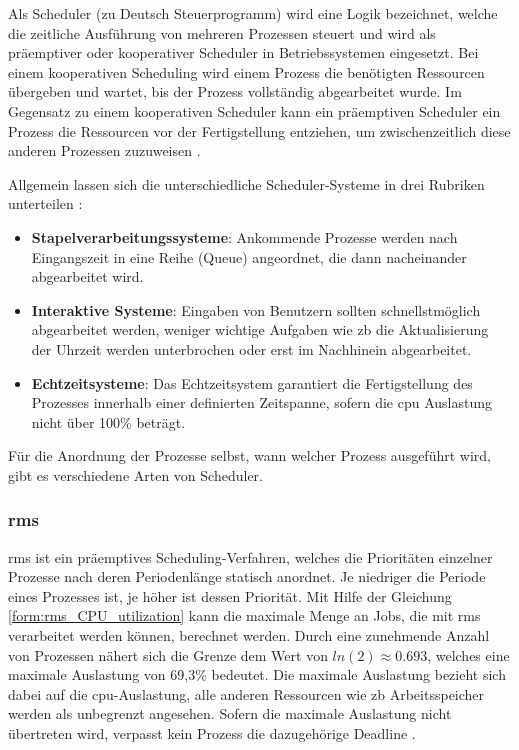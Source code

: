 \documentclass[../EDF Master Thesis.tex]{subfiles}
\begin{document}
Als Scheduler (zu Deutsch Steuerprogramm) wird eine Logik bezeichnet, welche die zeitliche Ausführung von mehreren Prozessen steuert und wird als präemptiver oder kooperativer Scheduler in Betriebssystemen eingesetzt.
Bei einem kooperativen Scheduling wird einem Prozess die benötigten Ressourcen übergeben und wartet, bis der Prozess vollständig abgearbeitet wurde.
Im Gegensatz zu einem kooperativen Scheduler kann ein präemptiven Scheduler ein Prozess die Ressourcen vor der Fertigstellung entziehen, um zwischenzeitlich diese anderen Prozessen zuzuweisen \parencite{wiki:003}.

Allgemein lassen sich die unterschiedliche Scheduler-Systeme in drei Rubriken unterteilen \parencite{wiki:007}:
\begin{itemize}
    \item \textbf{Stapelverarbeitungssysteme}: Ankommende Prozesse werden nach Eingangszeit in eine Reihe (Queue) angeordnet, die dann nacheinander abgearbeitet wird.
    \item \textbf{Interaktive Systeme}: Eingaben von Benutzern sollten schnellstmöglich abgearbeitet werden, weniger wichtige Aufgaben wie \ac{zb} die Aktualisierung der Uhrzeit werden unterbrochen oder erst im Nachhinein abgearbeitet.
    \item \textbf{Echtzeitsysteme}: Das Echtzeitsystem garantiert die Fertigstellung des Prozesses innerhalb einer definierten Zeitspanne, sofern die \ac{cpu} Auslastung nicht über 100\% beträgt.
\end{itemize}
Für die Anordnung der Prozesse selbst, wann welcher Prozess ausgeführt wird, gibt es verschiedene Arten von Scheduler.


\subsubsection{\ac{rms}} \label{section:rms}
    \ac{rms} ist ein präemptives Scheduling-Verfahren, welches die Prioritäten einzelner Prozesse nach deren Periodenlänge statisch anordnet.
    Je niedriger die Periode eines Prozesses ist, je höher ist dessen Priorität.
    Mit Hilfe der Gleichung \ref{form:rms_CPU_utilization} kann die maximale Menge an Jobs, die mit \ac{rms} verarbeitet werden können, berechnet werden.
    Durch eine zunehmende Anzahl von Prozessen nähert sich die Grenze dem Wert von $ln(2) \approx 0.693$, welches eine maximale Auslastung von 69,3\% bedeutet.
    Die maximale Auslastung bezieht sich dabei auf die \ac{cpu}-Auslastung, alle anderen Ressourcen wie \ac{zb} Arbeitsspeicher werden als unbegrenzt angesehen.
    Sofern die maximale Auslastung nicht übertreten wird, verpasst kein Prozess die dazugehörige Deadline \parencite{wiki:004}.
\end{document}

